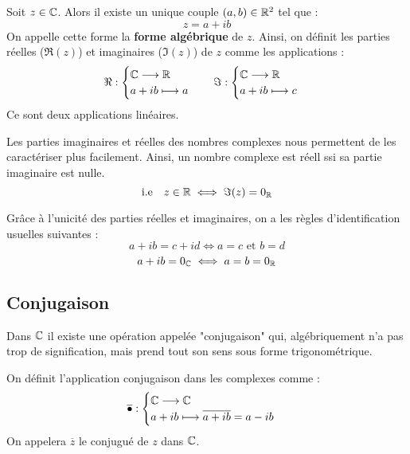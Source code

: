 \begin{definition}
    Soit $z \in \mathbb{C}$. Alors il existe un unique couple $(a,b) \in \mathbb{R}^2$ tel que : 
        \[ z = a + ib \] 
    On appelle cette forme la \textbf{forme algébrique} de $z$. 
    Ainsi, on définit les parties réelles ($ \Re (z)$) et imaginaires ($ \Im (z)$) de $z$ comme les applications : 
        \[ \Re : 
            \begin{cases}
                \mathbb{C} \longrightarrow \mathbb{R} \\ 
                a + ib \longmapsto a 
            \end{cases}
        \quad \Im : 
            \begin{cases}
                \mathbb{C} \longrightarrow \mathbb{R} \\ 
                a + ib \longmapsto c 
            \end{cases} \] 
    Ce sont deux applications linéaires. 
\end{definition}

\begin{proposition}
    Les parties imaginaires et réelles des nombres complexes nous permettent de les caractériser plus facilement. 
    Ainsi, un nombre complexe est réell ssi sa partie imaginaire est nulle. 
        \[ \text{i.e} \quad z \in \mathbb{R} \iff \Im (z) = 0_{\mathbb{R}} \] 
\end{proposition}

\begin{remark}
    Grâce à l'unicité des parties réelles et imaginaires, on a les règles d'identification usuelles suivantes : 
        \[ a+ ib = c + id \iff a = c \text{ et } b = d \] 
        \[ a+ ib = 0_{\mathbb{C}} \iff a = b = 0_{\mathbb{R}} \] 
\end{remark}

\subsection{Conjugaison}

Dans $\mathbb{C}$ il existe une opération appelée "conjugaison" qui, algébriquement n'a pas trop de signification, mais 
prend tout son sens sous forme trigonométrique. 

\begin{definition}[Conjugaison]
    On définit l'application conjugaison dans les complexes comme : 
    \[ \overline{\bullet} : 
        \begin{cases}
            \mathbb{C} \longrightarrow \mathbb{C} \\ 
            a + i b \longmapsto \overline{a+ib} = a- i b
        \end{cases} \] 
    On appelera $\overline{z}$ le conjugué de $z$ dans $\mathbb{C}$. 
\end{definition}

